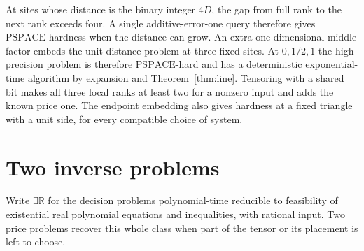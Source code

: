 \documentclass[11pt,letterpaper]{article}
\theoremstyle{definition}
\newcommand{\R}{\mathbb R}
\newcommand{\PSPACE}{\mathrm{PSPACE}}
\newcommand{\etr}{\exists\R}
\begin{document}
At sites whose distance is the binary integer \(4D\), the gap from full
rank to the next rank exceeds four. A single additive-error-one query
therefore gives \(\PSPACE\)-hardness when the distance can grow.
An extra one-dimensional middle factor embeds the unit-distance problem at three
fixed sites. At \(0,1/2,1\) the high-precision problem is therefore
\(\PSPACE\)-hard and has a deterministic exponential-time algorithm by
expansion and Theorem~\ref{thm:line}. Tensoring with a shared bit makes
all three local ranks at least two for a nonzero input and adds the
known price one. The endpoint embedding also gives hardness at a fixed
triangle with a unit side, for every compatible choice of system.

\section{Two inverse problems}
\label{sec:inverse}

Write \(\etr\) for the decision problems polynomial-time reducible to
feasibility of existential real polynomial equations and inequalities,
with rational input. Two price problems recover this whole class when
part of the tensor or its placement is left to choose.
\end{document}
